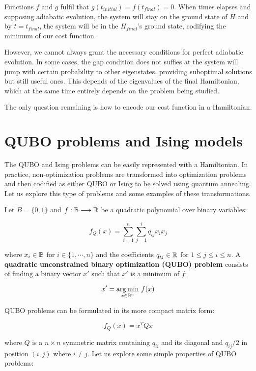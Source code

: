 Functions $f$ and $g$ fulfil that $g(t_{initial}) = f(t_{final}) = 0$. When times elapses and supposing adiabatic evolution, the system will stay on the ground state of $H$ and by $t = t_{final}$, the system will be in the $H_{final}$'s ground state, codifying the minimum of our cost function.

However, we cannot always grant the necessary conditions for perfect adiabatic evolution. In some cases, the gap condition does not suffies at the system will jump with certain probability to other eigenstates, providing suboptimal solutions but still useful ones. This depends of the eigenvalues of the final Hamiltonian, which at the same time entirely depends on the problem being studied.

The only question remaining is how to encode our cost function in a Hamiltonian.


\section{QUBO problems and Ising models}


The QUBO and Ising problems can be easily represented with a Hamiltonian. In practice, non-optimization problems are transformed into optimization problems and then codified as either QUBO or Ising to be solved using quantum annealing. Let us explore this type of problems and some examples of these transformations.

Let $B = \{0,1\}$ and $f: \mathbb{B} \longrightarrow \mathbb{R} $ be a quadratic polynomial over binary variables:

$$ f_Q(x) = \sum_{i=1}^n \sum_{j=1}^i q_{ij} x_i x_j $$

where $x_i \in \mathbb{B}$ for $i \in \{1, \cdots, n\}$ and the coefficients $q_{ij} \in \mathbb{R}$ for $1 \leq j \leq i \leq n$. A \textbf{quadratic unconstrained binary optimization (QUBO) problem} consists of finding a binary vector $x'$ such that $x'$ is a minimum of $f$:

$$ x' = \underset {x \in \mathbb{B}^n }{\arg \min} ~ f(x) $$

QUBO problems can be formulated in its more compact matrix form:

$$ f_Q(x) = x^T Q x $$

where $Q$ is a $n \times n$ symmetric matrix containing $q_{ii}$ and its diagonal and $q_{ij} / 2$ in position $(i,j)$ where $i \neq j$. Let us explore some simple properties of QUBO problems:

